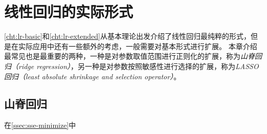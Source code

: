 \chapter{线性回归的实际形式}

\cref{cht:lr-basic}和\cref{cht:lr-extended}从基本理论出发介绍了线性回归最纯粹的形式，但是在实际应用中还有一些额外的考虑，一般需要对基本形式进行扩展。
本章介绍最常见也是最重要的两种，一种是对参数取值范围进行正则化的扩展，称为\emph{山脊回归（ridge regression）}，另一种是对参数按照敏感性进行选择的扩展，称为\emph{LASSO回归（least absolute shrinkage and selection operator）}。

\section{山脊回归}
在\cref{ssec:sse-minimize}中